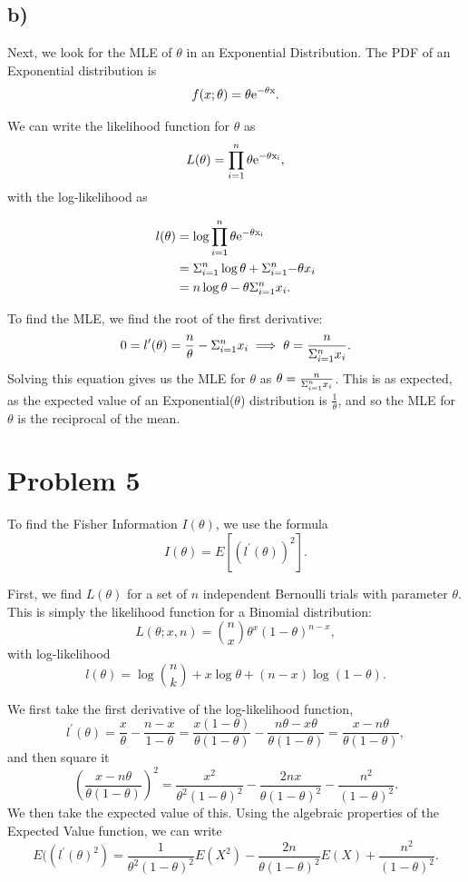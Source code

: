 \documentclass[]{article}
\begin{document}
\subsection{b)}\label{b-3}

Next, we look for the MLE of \(\theta\) in an Exponential Distribution.
The PDF of an Exponential distribution is \[
f(x; \theta) = \theta \rm{e}^{-\theta x}.
\]

We can write the likelihood function for \(\theta\) as \[
L(\theta) = \prod_{i=1}^{n}\theta\rm{e}^{-\theta x_i}, 
\] with the log-likelihood as

\begin{align*}
l(\theta) &= \log{\prod_{i=1}^{n}\theta\rm{e}^{-\theta x_i}} \\
&= \Sigma_{i=1}^{n} \log{\theta} + \Sigma_{i=1}^{n}{-\theta x_i} \\
&= n \log{\theta} - \theta \Sigma_{i=1}^{n} x_i.
\end{align*}

To find the MLE, we find the root of the first derivative: \[
0 = l^{\prime}(\theta) = \frac{n}{\theta} -  \Sigma_{i=1}^{n} x_i \implies \theta = \frac{n}{\Sigma_{i=1}^{n} x_i}.
\] Solving this equation gives us the MLE for \(\theta\) as
\(\theta = \frac{n}{\Sigma_{i=1}^{n} x_i}\). This is as expected, as the expected
value of an Exponential(\(\theta\)) distribution is
\(\frac{1}{\theta}\), and so the MLE for \(\theta\) is the reciprocal of
the mean.

\section{Problem 5}\label{problem-5}

To find the Fisher Information \(I(\theta)\), we use the formula \[
I(\theta) = E[(l^{\prime}(\theta))^2].
\]

First, we find \(L(\theta)\) for a set of \(n\) independent Bernoulli
trials with parameter \(\theta\). This is simply the likelihood function
for a Binomial distribution: \[
L(\theta; x, n) = {n\choose x} \theta^x (1-\theta)^{n-x}, 
\] with log-likelihood \[
l(\theta) = \log{n \choose k} + x\log{\theta} + (n - x) \log{(1 - \theta)}.
\]

We first take the first derivative of the log-likelihood function, \[
l^{\prime}(\theta) = \frac{x}{\theta} - \frac{n - x}{1- \theta} = 
\frac{x (1 - \theta)}{\theta(1 - \theta)} - \frac{n\theta - x\theta}{\theta (1 - \theta)} = \frac{x - n \theta}{\theta(1 - \theta)}, 
\] and then square it \[
\left(\frac{x - n \theta}{\theta(1 - \theta)}\right)^2 = \frac{x^2}{\theta^2 (1 - \theta)^2} - \frac{2nx}{\theta(1-\theta)^2} - \frac{n^2}{(1-\theta)^2}.
\] We then take the expected value of this. Using the algebraic
properties of the Expected Value function, we can write \[
E((l^{\prime}(\theta)^2) = \frac{1}{\theta^2(1 - \theta)^2}E(X^2) - \frac{2n}{\theta(1-\theta)^2}E(X) + \frac{n^2}{(1 - \theta)^2}.
\]
\end{document}
